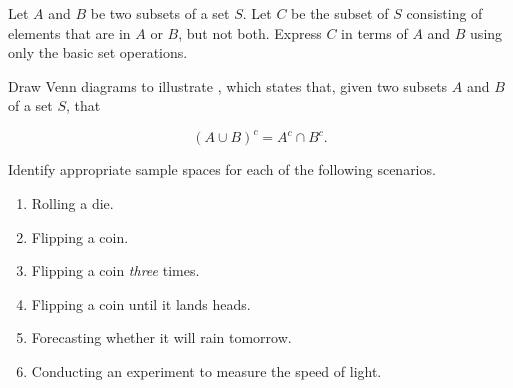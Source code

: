 \documentclass[12pt,reqno]{amsart}
\begin{document}
\bigskip

\prob Let $A$ and $B$ be two subsets of a set $S$. Let $C$ be the subset of $S$ consisting of elements that are in $A$ or $B$, but not both. Express $C$ in terms of $A$ and $B$ using only the basic set operations.

















\vspace{2in}
\prob Draw Venn diagrams to illustrate , which states that, given two subsets $A$ and $B$ of a set $S$, that

    \[(A\cup B)^c = A^c \cap B^c.\]












\vspace{2in}
\prob Identify appropriate sample spaces for each of the following scenarios.

\medskip
\begin{enumerate}
    \item Rolling a die.\vfill
    
    

    \item Flipping a coin.\vfill
    


    \item Flipping a coin \textit{three} times.\vfill
    


    \item Flipping a coin until it lands heads.\vfill
    


    \item Forecasting whether it will rain tomorrow.\vfill
    


    \item Conducting an experiment to measure the speed of light.\vfill
    

\end{enumerate}
\end{document}

